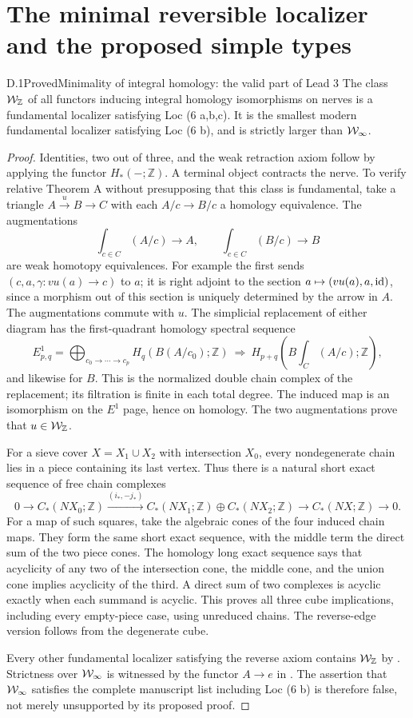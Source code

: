 \section{The minimal reversible localizer and the proposed simple types}

\begin{claim}{D.1}{Proved}{Minimality of integral homology: the valid part of Lead 3}
The class $\mathcal{W}_{\mathbb Z}$ of all functors inducing integral homology isomorphisms on nerves is a fundamental localizer satisfying Loc (6 a,b,c). It is the smallest modern fundamental localizer satisfying Loc (6 b), and is strictly larger than $\mathcal{W}_{\infty}$.
\end{claim}
\begin{proof}
Identities, two out of three, and the weak retraction axiom follow by applying the functor $H_*(-;\mathbb Z)$. A terminal object contracts the nerve. To verify relative Theorem A without presupposing that this class is fundamental, take a triangle $A\xrightarrow{u}B\to C$ with each $A/c\to B/c$ a homology equivalence. The augmentations
\[
 \int_{c\in C}(A/c)\longrightarrow A,\qquad
 \int_{c\in C}(B/c)\longrightarrow B
\]
are weak homotopy equivalences. For example the first sends $(c,a,\gamma:v u(a)\to c)$ to $a$; it is right adjoint to the section $a\mapsto(vu(a),a,\mathrm{id})$, since a morphism out of this section is uniquely determined by the arrow in $A$. The augmentations commute with $u$. The simplicial replacement of either diagram has the first-quadrant homology spectral sequence
\[
 E^1_{p,q}=\bigoplus_{c_0\to\cdots\to c_p}H_q(B(A/c_0);\mathbb Z)
 \ \Longrightarrow\ H_{p+q}\left(B\int_C(A/c);\mathbb Z\right),
\]
and likewise for $B$. This is the normalized double chain complex of the replacement; its filtration is finite in each total degree. The induced map is an isomorphism on the $E^1$ page, hence on homology. The two augmentations prove that $u\in\mathcal{W}_{\mathbb Z}$.

For a sieve cover $X=X_1\cup X_2$ with intersection $X_0$, every nondegenerate chain lies in a piece containing its last vertex. Thus there is a natural short exact sequence of free chain complexes
\[
 0\to C_*(NX_0;\mathbb Z)
 \xrightarrow{(i_*,-j_*)}C_*(NX_1;\mathbb Z)\oplus C_*(NX_2;\mathbb Z)
 \to C_*(NX;\mathbb Z)\to0.
\]
For a map of such squares, take the algebraic cones of the four induced chain maps. They form the same short exact sequence, with the middle term the direct sum of the two piece cones. The homology long exact sequence says that acyclicity of any two of the intersection cone, the middle cone, and the union cone implies acyclicity of the third. A direct sum of two complexes is acyclic exactly when each summand is acyclic. This proves all three cube implications, including every empty-piece case, using unreduced chains. The reverse-edge version follows from the degenerate cube.

Every other fundamental localizer satisfying the reverse axiom contains $\mathcal{W}_{\mathbb Z}$ by . Strictness over $\mathcal{W}_{\infty}$ is witnessed by the functor $A\to e$ in . The assertion that $\mathcal{W}_{\infty}$ satisfies the complete manuscript list including Loc (6 b) is therefore false, not merely unsupported by its proposed proof.
\end{proof}

